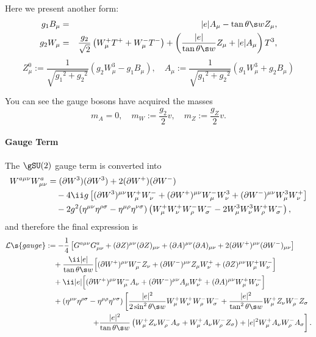 \begin{rightnote}
Here we present another form:
\begin{eqnarray}
  g_1B_\mu
&=& |e| A_\mu-\tan\theta\s w Z_\mu,\\
 g_2W_\mu
&=& \frac{g_2}{\sqrt2}\left(W^+_\mu T^+ + W^-_\mu T^-\right)
   +\left(\frac{|e|}{\tan\theta\s w}Z_\mu+|e|A_\mu\right)T^3,
\end{eqnarray}
\begin{equation}
Z^0_\mu:=\frac1{\sqrt{{g_1}^2+{g_2}^2}}(g_2 W^3_\mu-g_1B_\mu),\quad
A_\mu:=\frac1{\sqrt{{g_1}^2+{g_2}^2}}(g_1 W^3_\mu+g_2B_\mu)
\end{equation}
\end{rightnote}

You can see the gauge bosons have acquired the masses
\begin{equation}
  m_A = 0, \quad m_W :=\frac{g_2}2v,\quad m_Z :=\frac{g_Z}2v.
\end{equation}


\paragraph{Gauge Term}
The $\gSU(2)$ gauge term is converted into
\begin{align*}
   W^{a\mu\nu}W^a_{\mu\nu}
&= (\partial W^3)(\partial W^3) + 2(\partial W^+)(\partial W^-)
\\&\quad
- 4\ii g\left[
     (\partial W^3)^{\mu\nu}W^+_\mu W^-_\nu
   + (\partial W^+)^{\mu\nu}W^-_\mu W^3_\nu
   + (\partial W^-)^{\mu\nu}W^3_\mu W^+_\nu
\right]
\\&\quad
 -2g^2(\Hmn\Hrs-\Hmr\Hns)
\left(
  W^+_\mu W^+_\nu W^-_\rho W^-_\sigma  - 2 W^3_\mu W^3_\nu W^+_\rho W^-_\sigma
\right),
\end{align*}
and therefore the final expression is
\begin{equation}
\label{eq:SMGaugeKineticGZG}
\begin{split}
 \Lag\s{gauge}&:=
-\frac14\left[
G^{a\mu\nu}G^a_{\mu\nu} + (\partial Z)^{\mu\nu}(\partial Z)_{\mu\nu}+(\partial A)^{\mu\nu}(\partial A)_{\mu\nu}+2(\partial W^+)^{\mu\nu}(\partial W^-)_{\mu\nu}
\right]\\&\quad
+\frac{\ii |e|}{\tan\theta\s w}\Bigl[
(\partial W^+)^{\mu\nu}W^-_\mu Z_\nu + (\partial W^-)^{\mu\nu}Z_\mu W^+_\nu +  (\partial Z)^{\mu\nu}W^+_\mu W^-_\nu
\Bigr]\\&\quad
+ \ii |e|\Bigl[
(\partial W^+)^{\mu\nu}W^-_\mu A_\nu + (\partial W^-)^{\mu\nu}A_\mu W^+_\nu +  (\partial A)^{\mu\nu}W^+_\mu W^-_\nu
\Bigr]\\&\quad
+(\Hmn\Hrs-\Hmr\Hns)\left[
\frac{|e|^2}{2\sin^2\theta\s w}W^+_\mu W^+_\nu W^-_\rho W^-_\sigma
+\frac{|e|^2}{\tan^2\theta\s w}W^+_\mu Z_\nu W^-_\rho Z_\sigma
\right.\\&\left.\qquad\qquad\qquad
+\frac{|e|^2}{\tan\theta\s w}\left(W^+_\mu Z_\nu W^-_\rho A_\sigma + W^+_\mu A_\nu W^-_\rho Z_\sigma\right)
+|e|^2W^+_\mu A_\nu W^-_\rho A_\sigma\right].
\end{split}
\end{equation}

